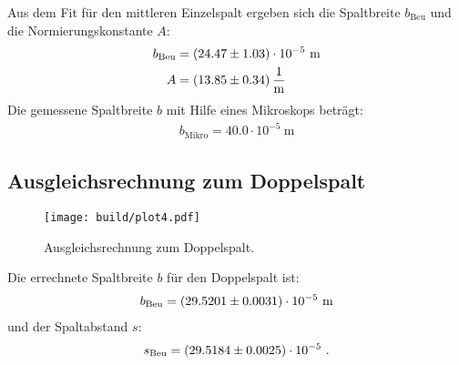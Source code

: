 Aus dem Fit für den mittleren Einzelspalt ergeben sich die Spaltbreite $b_\text{Beu}$ und die Normierungskonstante $A$:
\begin{align*}
  b_\text{Beu} & = (\num{24.47 +- 1.03}) \cdot 10^{-5} \ \text{m} \\
  A & = (\num{13.85 +- 0.34}) \, \frac{1}{\text{m}}
\end{align*}
Die gemessene Spaltbreite $b$ mit Hilfe eines Mikroskops beträgt:
\begin{align*}
  b_\text{Mikro} = 40.0 \cdot 10^{-5} \ \text{m}
\end{align*}

\subsection{Ausgleichsrechnung zum Doppelspalt}
\begin{figure}[H] %
  \centering
  \texttt{[image: build/plot4.pdf]}
  \caption{Ausgleichsrechnung zum Doppelspalt.}
  \label{fig:Doppel}
\end{figure}

Die errechnete Spaltbreite $b$ für den Doppelspalt ist:
\begin{align*}
  b_\text{Beu} = (\num{29.5201 +- 0.0031}) \cdot 10^{-5} \ \text{m}
\end{align*}
und der Spaltabstand $s$:
\begin{align*}
  s_\text{Beu} = (\num{29.5184 +- 0.0025}) \cdot 10^{-5} \ .
\end{align*}
